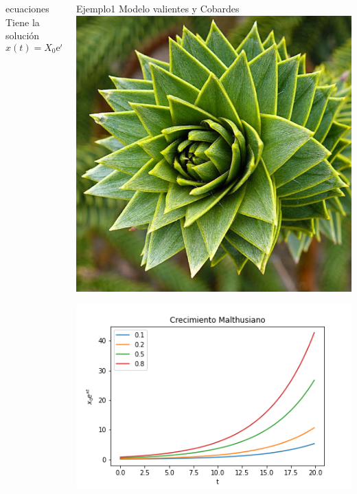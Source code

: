 \documentclass{beamer}
\begin{document}
\begin{frame}[fragile]
\begin{columns}[T]
\begin{column}{0.33\textwidth}
\begin{block}{ecuaciones}
 Tiene la solución 
\begin{equation}
    x(t)=X_0\mathrm{e}^{\kappa t}
\end{equation}
        \end{block}
    \end{column}
    \begin{column}{0.31\textwidth}
        \begin{block}{Ejemplo1}
            Modelo valientes y Cobardes
            \includegraphics[]{unnamed.jpg}
        \end{block}
        \begin{block}{}
            \includegraphics[width=\textwidth]{malthus2.png}
        \end{block}
    
    \end{column}
    
    \end{columns}
\end{frame}
\end{document}
